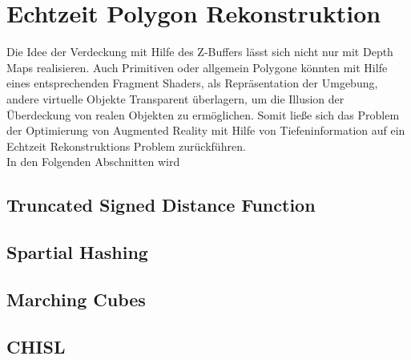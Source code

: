 \section{Echtzeit Polygon Rekonstruktion}

Die Idee der Verdeckung mit Hilfe des Z-Buffers lässt sich nicht nur mit Depth Maps realisieren. Auch Primitiven oder allgemein Polygone könnten mit Hilfe eines entsprechenden Fragment Shaders, als Repräsentation der Umgebung, andere virtuelle Objekte Transparent überlagern, um die Illusion der Überdeckung von realen Objekten zu ermöglichen. Somit ließe sich das Problem der Optimierung von Augmented Reality mit Hilfe von Tiefeninformation auf ein Echtzeit Rekonstruktions Problem zurückführen. \\

In den Folgenden Abschnitten wird 


\subsection{Truncated Signed Distance Function}

\subsection{Spartial Hashing}

\subsection{Marching Cubes}

\subsection{CHISL}


